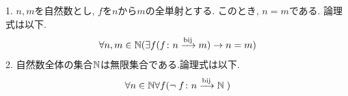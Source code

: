 \begin{proposition}[p184の命題7.1.2]
	1. $n,m$を自然数とし,
	$f$を$n$から$m$の全単射とする.
	このとき,
	$n=m$である.
	論理式は以下.
	\begin{equation*}
	\forall n ,m \in \mathbb{N} (\exists f(f\colon n \xrightarrow{\text{bij}} m) \rightarrow n = m)
	\end{equation*}
	2. 自然数全体の集合$\mathbb{N}$は無限集合である.論理式は以下.
	\begin{equation*}
	\forall n \in \mathbb{N} \forall f( \lnot \; f\colon n \xrightarrow{\text{bij}} \mathbb{N} \; )
	\end{equation*}
\end{proposition}
